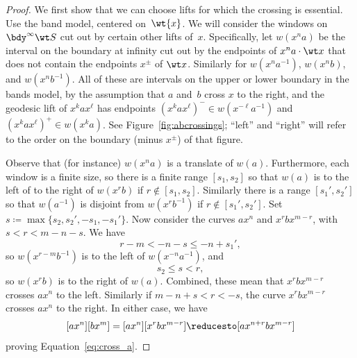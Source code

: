 \begin{proof}
  We first show that we can choose lifts for which the crossing is
  essential. Use the band model, centered on~$\wt{x}$. We will
  consider the windows on $\bdy^\infty\wt S$ cut out by certain other
  lifts of~$x$. Specifically, let $w(x^na)$ be the interval on the
  boundary at infinity cut out by the endpoints of $x^n a \cdot \wt x$
  that does not contain the endpoints $x^\pm$ of $\wt x$. Similarly for
  $w(x^n a^{-1})$, $w(x^n b)$, and $w(x^n b^{-1})$. All of these are intervals
  on the upper or lower boundary in the bands model, by the assumption
  that $a$ and~$b$ cross $x$ to the right, and the geodesic lift of
  $x^kax^\ell$ has endpoints $(x^kax^\ell)^- \in w(x^{-\ell}a^{-1})$
  and $(x^kax^\ell)^+ \in w(x^ka)$.
  See Figure~\ref{fig:abcrossings}; ``left'' and ``right'' will refer
  to the order on the boundary (minus $x^\pm$) of that figure.

  \begin{figure}
\end{figure}

  Observe that (for instance) $w(x^n a)$ is a translate of $w(a)$.
  Furthermore, each window is a
  finite size, so there is a finite range $[s_1,s_2]$ so that $w(a)$
  is to the left of to the right of $w(x^rb)$ if $r \notin [s_1,s_2]$. Similarly there
  is a range $[s_1',s_2']$ so that $w(a^{-1})$ is disjoint from
  $w(x^rb^{-1})$ if $r \notin [s_1',s_2']$. Set
  $s \coloneqq \max\{s_2,s_2',-s_1,-s_1'\}$. Now consider the curves 
  $ax^n$ and $x^rbx^{m-r}$, with $s < r < m-n-s$. We have
  \[
    r-m < -n-s \le -n+s_1',
  \]
  so $w(x^{r-m}b^{-1})$ is to the left of $w(x^{-n}a^{-1})$, and
  \[
    s_2 \le s < r,
  \]
  so $w(x^rb)$ is to the right of $w(a)$. Combined, these mean that
  $x^rbx^{m-r}$ crosses $ax^n$ to the left. Similarly if
  $m-n+s < r < -s$, the curve $x^rbx^{m-r}$ crosses $ax^n$ to the
  right. In either case, we have
  \[
    [ax^n][bx^m] = [ax^n][x^r bx^{m-r}] \reducesto [ax^{n+r}bx^{m-r}]
  \]
  proving Equation~\eqref{eq:cross_a}.


\end{proof}
